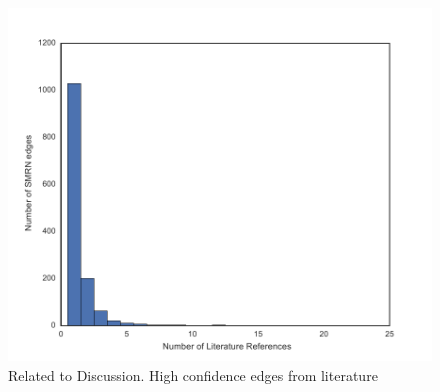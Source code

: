 \documentclass[12pt,a4paper]{article}
\begin{document}
\begin{figure}[ht!]
	\includegraphics[width=\textwidth]{../manuscript/figS11.pdf}
	\caption{Related to Discussion. High confidence edges from literature}
\end{figure}
\end{document}
